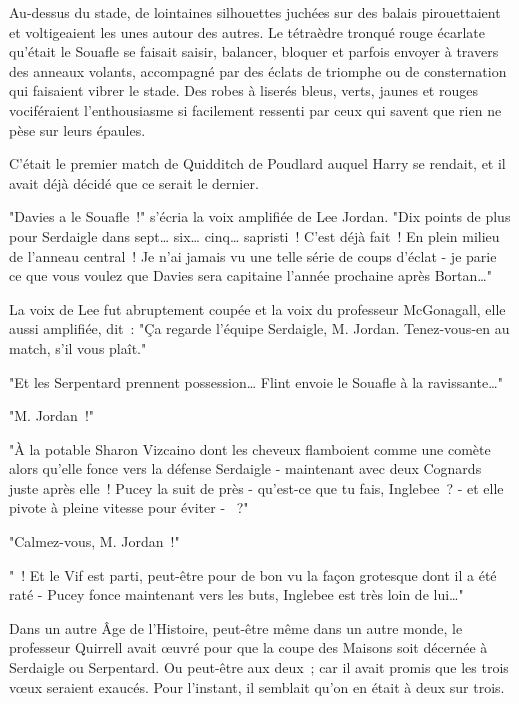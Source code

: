 \later

Au-dessus du stade, de lointaines silhouettes juchées sur des balais pirouettaient et voltigeaient les unes autour des autres. Le tétraèdre tronqué rouge écarlate qu'était le Souafle se faisait saisir, balancer, bloquer et parfois envoyer à travers des anneaux volants, accompagné par des éclats de triomphe ou de consternation qui faisaient vibrer le stade. Des robes à liserés bleus, verts, jaunes et rouges vociféraient l'enthousiasme si facilement ressenti par ceux qui savent que rien ne pèse sur leurs épaules.

C'était le premier match de Quidditch de Poudlard auquel Harry se rendait, et il avait déjà décidé que ce serait le dernier.

"Davies a le Souafle~!" s'écria la voix amplifiée de Lee Jordan. "Dix points de plus pour Serdaigle dans sept… six… cinq… sapristi~! C'est déjà fait~! En plein milieu de l'anneau central~! Je n'ai jamais vu une telle série de coups d'éclat - je parie ce que vous voulez que Davies sera capitaine l'année prochaine après Bortan…"

La voix de Lee fut abruptement coupée et la voix du professeur McGonagall, elle aussi amplifiée, dit~: "Ça regarde l'équipe Serdaigle, M. Jordan. Tenez-vous-en au match, s'il vous plaît."

"Et les Serpentard prennent possession… Flint envoie le Souafle à la ravissante…"

"M. Jordan~!"

"À la potable Sharon Vizcaino dont les cheveux flamboient comme une comète alors qu'elle fonce vers la défense Serdaigle - maintenant avec deux Cognards juste après elle~! Pucey la suit de près - qu'est-ce que tu fais, Inglebee~? - et elle pivote à pleine vitesse pour éviter - ~?"

"Calmez-vous, M. Jordan~!"

"~! Et le Vif est parti, peut-être pour de bon vu la façon grotesque dont il a été raté - Pucey fonce maintenant vers les buts, Inglebee est très loin de lui…"

Dans un autre Âge de l'Histoire, peut-être même dans un autre monde, le professeur Quirrell avait œuvré pour que la coupe des Maisons soit décernée à Serdaigle ou Serpentard. Ou peut-être aux deux~; car il avait promis que les trois vœux seraient exaucés. Pour l'instant, il semblait qu'on en était à deux sur trois.

